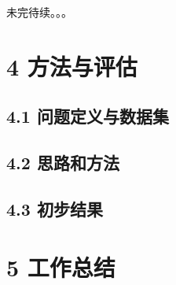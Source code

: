 \documentclass[a4paper,UTF8]{article}
\begin{document}
未完待续。。。


\section*{4 方法与评估}

\subsection*{4.1 问题定义与数据集}

\subsection*{4.2 思路和方法}

\subsection*{4.3 初步结果}



\section*{5 工作总结}
















\end{document}
